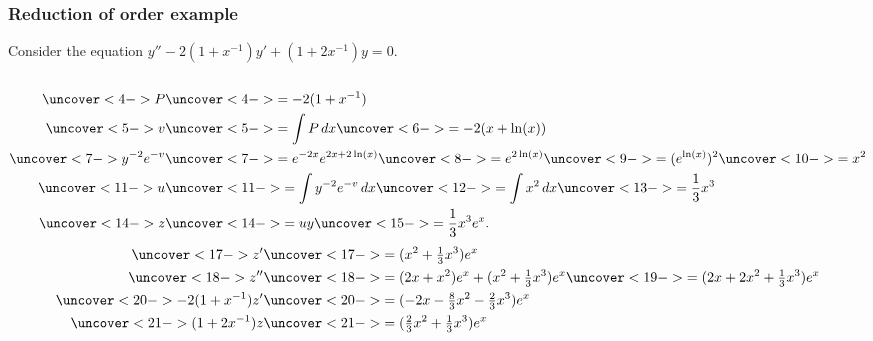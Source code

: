 \documentclass[9pt]{beamer}
\begin{document}
\begin{frame}[t]
 \frametitle{Reduction of order example}
 
 Consider the equation $y''-2(1+x^{-1})y'+(1+2x^{-1})y=0$.\\
 \\
 \begin{align*}
  \uc<4->{P} &\uc<4->{= -2(1+x^{-1})} \\
  \uc<5->{v} &\uc<5->{= \int P\,dx}\uc<6->{ = -2(x+\ln(x))} \\
  \uc<7->{y^{-2}e^{-v}} &\uc<7->{= e^{-2x} e^{2x+2\ln(x)}}\uc<8->{ = e^{2\ln(x)}}\uc<9->{ = (e^{\ln(x)})^2}\uc<10->{ = x^2} \\
  \uc<11->{u} &\uc<11->{= \int y^{-2}e^{-v}\,dx}\uc<12->{ = \int x^2\,dx}\uc<13->{ = \frac{1}{3}x^3} \\
  \uc<14->{z} &\uc<14->{= uy}\uc<15->{ = \frac{1}{3}x^3 e^x.}
 \end{align*}
  \vspace{-4ex}
 \begin{align*}
  \uc<17->{z'} &\uc<17->{= (x^2+\tfrac{1}{3}x^3)e^x} \\
  \uc<18->{z''} &\uc<18->{= (2x+x^2)e^x + (x^2+\tfrac{1}{3}x^3)e^x} 
       \uc<19->{= (2x+2x^2+\tfrac{1}{3}x^3)e^x}\\
  \uc<20->{-2(1+x^{-1})z'} &\uc<20->{= (-2x-\tfrac{8}{3}x^2-\tfrac{2}{3}x^3)e^x} \\
  \uc<21->{(1+2x^{-1})z} &\uc<21->{= (\tfrac{2}{3}x^2+\tfrac{1}{3}x^3)e^x}
 \end{align*}
\end{frame}
\end{document}
